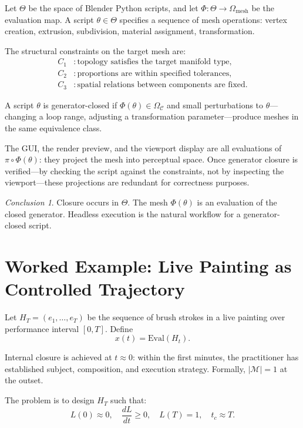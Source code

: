 \documentclass[11pt, twoside]{article}
\theoremstyle{plain}
\theoremstyle{definition}
\theoremstyle{remark}
\newtheorem{conclusion}[theorem]{Conclusion}
\newcommand{\OmC}{\Omega_{\mathcal{C}}}
\begin{document}
Let $\Theta$ be the space of Blender Python scripts, and let $\Phi : \Theta \to \Omega_{\text{mesh}}$ be the evaluation map. A script $\theta \in \Theta$ specifies a sequence of mesh operations: vertex creation, extrusion, subdivision, material assignment, transformation.

The structural constraints on the target mesh are:
\begin{align*}
C_1 &: \text{topology satisfies the target manifold type}, \\
C_2 &: \text{proportions are within specified tolerances}, \\
C_3 &: \text{spatial relations between components are fixed}.
\end{align*}

A script $\theta$ is generator-closed if $\Phi(\theta) \in \OmC$ and small perturbations to $\theta$---changing a loop range, adjusting a transformation parameter---produce meshes in the same equivalence class.

The GUI, the render preview, and the viewport display are all evaluations of $\pi \circ \Phi(\theta)$: they project the mesh into perceptual space. Once generator closure is verified---by checking the script against the constraints, not by inspecting the viewport---these projections are redundant for correctness purposes.

\begin{conclusion}
Closure occurs in $\Theta$. The mesh $\Phi(\theta)$ is an evaluation of the closed generator. Headless execution is the natural workflow for a generator-closed script.
\end{conclusion}

\section{Worked Example: Live Painting as Controlled Trajectory}
\label{app:live}

Let $H_T = (e_1, \dots, e_T)$ be the sequence of brush strokes in a live painting over performance interval $[0, T]$. Define
\[
x(t) = \text{Eval}(H_t).
\]

Internal closure is achieved at $t \approx 0$: within the first minutes, the practitioner has established subject, composition, and execution strategy. Formally, $|\mathcal{M}| = 1$ at the outset.

The problem is to design $H_T$ such that:
\[
L(0) \approx 0, \quad \frac{dL}{dt} \geq 0, \quad L(T) = 1, \quad t_c \approx T.
\]
\end{document}
